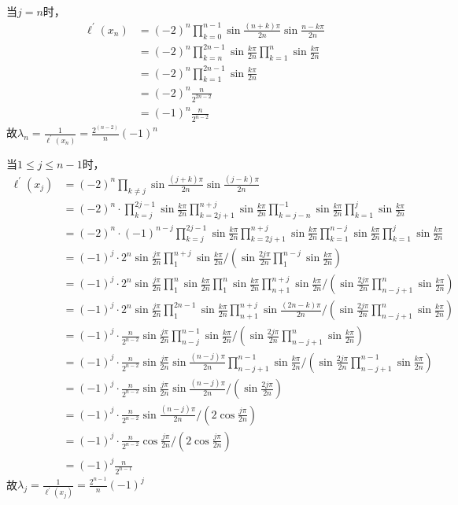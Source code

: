 \documentclass[12pt,a4paper,utf8]{ctexart}
\begin{document}
\begin{enumerate}
当$j=n$时，
\begin{equation}
   \begin{aligned}
      \ell^{'}(x_n)&=(-2)^n\prod_{k=0}^{n-1}\sin\frac{(n+k)\pi}{2n}\sin\frac{{n-k}\pi}{2n}\\
      &=(-2)^n \prod_{k=n}^{2n-1}\sin\frac{k\pi}{2n} \prod_{k=1}^{n}\sin\frac{k\pi}{2n}\\
      &=(-2)^n \prod_{k=1}^{2n-1}\sin\frac{k\pi}{2n}\\
      &=(-2)^n \frac{n}{2^{2n-2}}\\
      &=(-1)^n \frac{n}{2^{n-2}}
   \end{aligned}
\end{equation}
故$\lambda_n = \frac{1}{\ell^{'}(x_n)} = \frac{2^(n-2)}{n}(-1)^n$

当$1 \le j \le n-1$时，
\begin{equation}
   \begin{aligned}
      \ell^{'}(x_j)&=(-2)^n \prod_{k\ne j} \sin\frac{(j+k)\pi}{2n} \sin\frac{(j-k)\pi}{2n}\\
      &=(-2)^n \cdot \prod_{k=j}^{2j-1} \sin\frac{k\pi}{2n} \prod_{k=2j+1}^{n+j} \sin\frac{k\pi}{2n} \prod_{k=j-n}^{-1} \sin\frac{k\pi}{2n} \prod_{k=1}^{j} \sin\frac{k\pi}{2n}\\
      &=(-2)^n \cdot (-1)^{n-j} \prod_{k=j}^{2j-1}\sin\frac{k\pi}{2n} \prod_{k=2j+1}^{n+j}\sin\frac{k\pi}{2n} \prod_{k=1}^{n-j}\sin\frac{k\pi}{2n} \prod_{k=1}^{j}\sin\frac{k\pi}{2n}\\
      &=(-1)^j \cdot 2^n \sin\frac{j\pi}{2n} \prod_{1}^{n+j}\sin\frac{k\pi}{2n}/ (\sin\frac{2j\pi}{2n} \prod_{1}^{n-j}\sin\frac{k\pi}{2n} )\\
      &=(-1)^j \cdot 2^n \sin\frac{j\pi}{2n} \prod_{1}^{n}\sin\frac{k\pi}{2n} \prod_{1}^{n}\sin\frac{k\pi}{2n} \prod_{n+1}^{n+j}\sin\frac{k\pi}{2n} / (\sin\frac{2j\pi}{2n} \prod_{n-j+1}^{n}\sin\frac{k\pi}{2n})\\
      &=(-1)^j \cdot 2^n \sin\frac{j\pi}{2n} \prod_{1}^{2n-1}\sin\frac{k\pi}{2n} \prod_{n+1}^{n+j}\sin\frac{(2n-k)\pi}{2n}/(\sin\frac{2j\pi}{2n} \prod_{n-j+1}^{n}\sin\frac{k\pi}{2n})\\
      &=(-1)^j \cdot \frac{n}{2^{n-2}} \sin\frac{j\pi}{2n} \prod_{n-j}^{n-1}\sin\frac{k\pi}{2n}/(\sin\frac{2j\pi}{2n} \prod_{n-j+1}^{n}\sin\frac{k\pi}{2n})\\
      &=(-1)^j \cdot \frac{n}{2^{n-2}} \sin\frac{j\pi}{2n} \sin\frac{(n-j)\pi}{2n} \prod_{n-j+1}^{n-1}\sin\frac{k\pi}{2n}/ (\sin\frac{2j\pi}{2n} \prod_{n-j+1}^{n-1}\sin\frac{k\pi}{2n})\\
      &=(-1)^j \cdot \frac{n}{2^{n-2}} \sin\frac{j\pi}{2n} \sin\frac{(n-j)\pi}{2n}/ (\sin\frac{2j\pi}{2n})\\
      &=(-1)^j \cdot \frac{n}{2^{n-2}} \sin\frac{(n-j)\pi}{2n}/ (2\cos\frac{j\pi}{2n})\\
      &=(-1)^j \cdot \frac{n}{2^{n-2}} \cos\frac{j\pi}{2n}/ (2\cos\frac{j\pi}{2n})\\
      &=(-1)^j \frac{n}{2^{n-1}}
   \end{aligned}
\end{equation}
故$\lambda_j = \frac{1}{\ell^{'}(x_j)} = \frac{2^{n-1}}{n}(-1)^j$\\


\end{enumerate}
\end{document}
